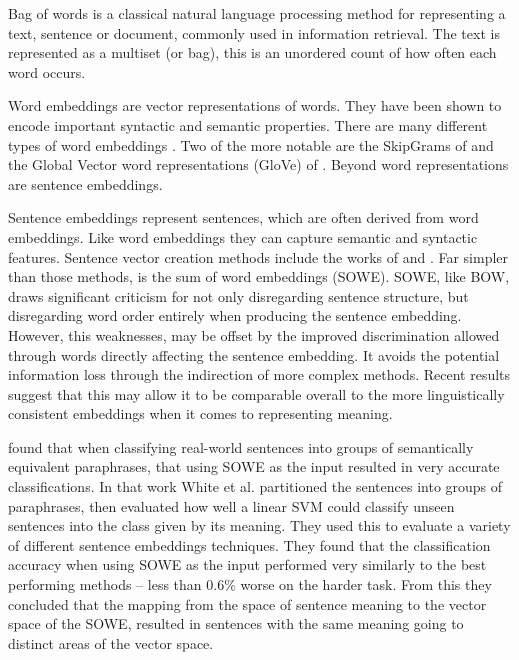 \documentclass{book}
\begin{document}
Bag of words is a classical natural language processing method for representing a text, sentence or document, commonly used in information retrieval. The text is represented as a multiset (or bag), this is an unordered count of how often each word occurs.

Word embeddings are vector representations of words. They have been shown to encode important syntactic and semantic properties. There are many different types of word embeddings \parencite{Yin2015}. Two of the more notable are the SkipGrams of \textcite{mikolov2013efficient,mikolov2013linguisticsubstructures} and the Global Vector word representations (GloVe) of \textcite{pennington2014glove}. Beyond word representations are sentence embeddings. 

Sentence embeddings represent sentences, which are often derived from word embeddings. Like word embeddings they can capture semantic and syntactic features. Sentence vector creation methods include the works of \textcite{le2014distributed} and \textcite{socher2014recursive}. Far simpler than those methods, is the  sum of word embeddings (SOWE). SOWE, like BOW, draws significant criticism for not only disregarding sentence structure, but disregarding word order entirely when producing the sentence embedding. However, this weaknesses, may be offset by the improved discrimination allowed through words directly affecting the sentence embedding. It avoids the potential information loss through the indirection of more complex methods. Recent results suggest that this may allow it to be comparable overall to the more linguistically consistent embeddings when it comes to representing meaning. 


\textcite{White2015SentVecMeaning} found that when classifying real-world sentences into groups of semantically equivalent paraphrases, that using SOWE as the input resulted in very accurate classifications. In that work White et al. partitioned the sentences into groups of paraphrases, then evaluated how well a linear SVM could classify unseen sentences into the class given by its meaning. They used this to evaluate a  variety of different sentence embeddings techniques. They found that the classification accuracy when using SOWE as the input performed very similarly to the best performing methods -- less than 0.6\% worse on the harder task. From this they concluded that the mapping from the space of sentence meaning to the vector space of the SOWE, resulted in sentences with the same meaning going to distinct areas of the vector space.
\end{document}
